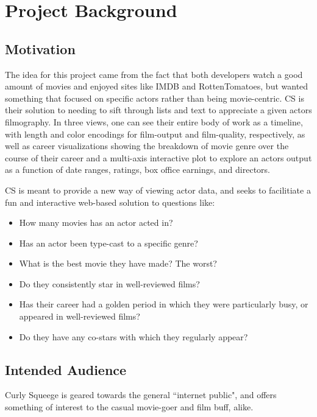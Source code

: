 \documentclass[12pt]{article}
\begin{document}
\newpage

\section{Project Background}

\subsection{Motivation}\label{sec:Motivation}
	The idea for this project came from the fact that both developers watch a good amount of movies and enjoyed sites like IMDB and RottenTomatoes, but wanted something that focused on specific actors rather than being movie-centric. CS is their solution to needing to sift through lists and text to appreciate a given actors filmography. In three views, one can see their entire body of work as a timeline, with length and color encodings for film-output and film-quality, respectively, as well as career visualizations showing the breakdown of movie genre over the course of their career and a multi-axis interactive plot to explore an actors output as a function of date ranges, ratings, box office earnings, and directors.
	
	CS is meant to provide a new way of viewing actor data, and seeks to facilitiate a fun and interactive web-based solution to questions like:


	\begin{itemize}
		\item How many movies has an actor acted in?
		\item Has an actor been type-cast to a specific genre?
		\item What is the best movie they have made? The worst?
		\item Do they consistently star in well-reviewed films?
		\item Has their career had a golden period in which they were particularly busy, or appeared in well-reviewed films?
		\item Do they have any co-stars with which they regularly appear?
	\end{itemize}
	
\subsection{Intended Audience}
Curly Squeege is geared towards the general ``internet public", and offers something of interest to the casual movie-goer  and film buff, alike.  
\end{document}
